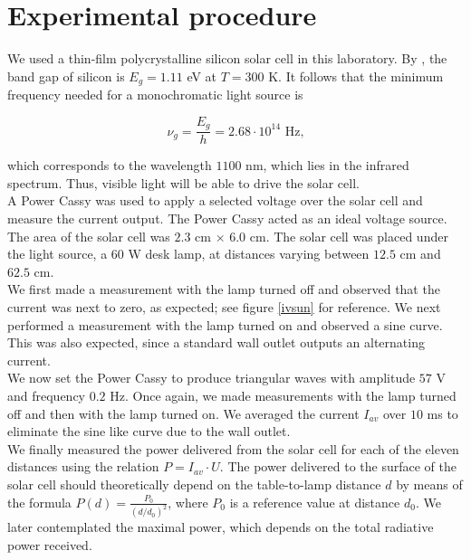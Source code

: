 \documentclass[12pt,a4paper]{article}
\begin{document}
\section{Experimental procedure}

We used a thin-film polycrystalline silicon solar cell in this laboratory. By \cite{kittel}, the band gap of silicon is $E_g = 1.11$ eV at $T = 300$ K. It follows that the minimum frequency needed for a monochromatic light source is

$$\nu_g = \frac{E_g}{h} = 2.68 \cdot 10^{14}\text{ Hz,}$$

which corresponds to the wavelength $1100$ nm, which lies in the infrared spectrum. Thus, visible light will be able to drive the solar cell. \\

A Power Cassy was used to apply a selected voltage over the solar cell and measure the current output. The Power Cassy acted as an ideal voltage source. The area of the solar cell was $2.3$ cm $\times$ $6.0$ cm. The solar cell was placed under the light source, a $60$ W desk lamp, at distances varying between $12.5$ cm and $62.5$ cm. \\

We first made a measurement with the lamp turned off and observed that the current was next to zero, as expected; see figure \ref{ivsun} for reference. We next performed a measurement with the lamp turned on and observed a sine curve. This was also expected, since a standard wall outlet outputs an alternating current. \\

We now set the Power Cassy to produce triangular waves with amplitude $57$ V and frequency $0.2$ Hz. Once again, we made measurements with the lamp turned off and then with the lamp turned on. We averaged the current $I_{av}$ over $10$ ms to eliminate the sine like curve due to the wall outlet. \\

We finally measured the power delivered from the solar cell for each of the eleven distances using the relation $P = I_{av} \cdot U$. The power delivered to the surface of the solar cell should theoretically depend on the table-to-lamp distance $d$ by means of the formula $P(d) = \frac{P_0}{(d/d_0)^2}$, where $P_0$ is a reference value at distance $d_0$. We later contemplated the maximal power, which depends on the total radiative power received.
\end{document}
